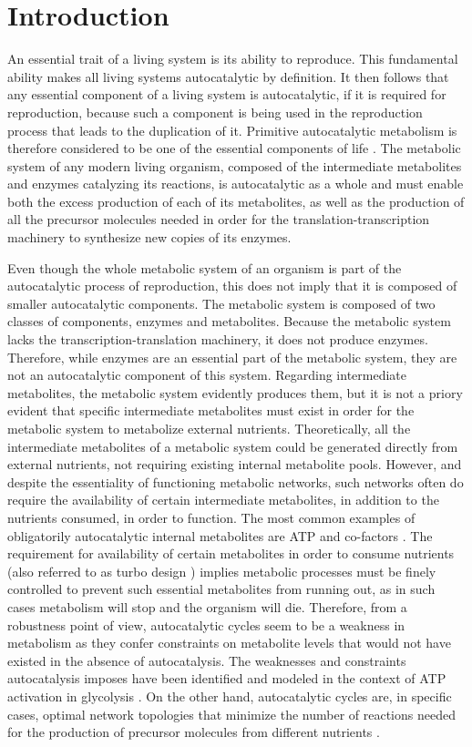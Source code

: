 \section{Introduction}
    An essential trait of a living system is its ability to reproduce.
    This fundamental ability makes all living systems autocatalytic by definition.
    It then follows that any essential component of a living system is autocatalytic, if it is required for reproduction, because  such a component is being used in the reproduction process that leads to the duplication of it.
    Primitive autocatalytic metabolism is therefore considered to be one of the essential components of life \cite{Ganti2003-ch}.
    The metabolic system of any modern living organism, composed of the intermediate metabolites and enzymes catalyzing its reactions, is autocatalytic as a whole and must enable both the excess production of each of its metabolites, as well as the production of all the precursor molecules needed in order for the translation-transcription machinery to synthesize new copies of its enzymes.

    Even though the whole metabolic system of an organism is part of the autocatalytic process of reproduction, this does not imply that it is composed of smaller autocatalytic components.
    The metabolic system is composed of two classes of components, enzymes and metabolites.
    Because the metabolic system lacks the transcription-translation machinery, it does not produce enzymes.
    Therefore, while enzymes are an essential part of the metabolic system, they are not an autocatalytic component of this system.
    Regarding intermediate metabolites, the metabolic system evidently produces them, but it is not a priory evident that specific intermediate metabolites must exist in order for the metabolic system to metabolize external nutrients.
    Theoretically, all the intermediate metabolites of a metabolic system could be generated directly from external nutrients, not requiring existing internal metabolite pools.
    However, and despite the essentiality of functioning metabolic networks, such networks often do require the availability of certain intermediate metabolites, in addition to the nutrients consumed, in order to function.
    The most common examples of obligatorily autocatalytic internal metabolites are ATP and co-factors \cite{Kun2008-xg}.
    The requirement for availability of certain metabolites in order to consume nutrients (also referred to as turbo design \cite{Teusink1998-he}) implies metabolic processes must be finely controlled to prevent such essential metabolites from running out, as in such cases metabolism will stop and the organism will die.
    Therefore, from a robustness point of view, autocatalytic cycles seem to be a weakness in metabolism as they confer constraints on metabolite levels that would not have existed in the absence of autocatalysis.
    The weaknesses and constraints autocatalysis imposes have been identified and modeled in the context of ATP activation in glycolysis \cite{Teusink1998-he}.
    On the other hand, autocatalytic cycles are, in specific cases, optimal network topologies that minimize the number of reactions needed for the production of precursor molecules from different nutrients \cite{Riehl2010-yh}.

